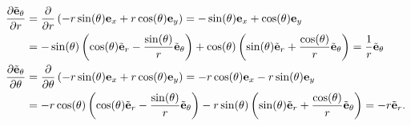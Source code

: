 \begin{example}
\begin{align*}
    \pdv{\tilde{\mathbf{e}}_\theta}{r} &= \pdv{}{r}\left(-r\sin(\theta) \mathbf{e}_x + r\cos(\theta)\mathbf{e}_y\right) = -\sin(\theta)\mathbf{e}_x + \cos(\theta)\mathbf{e}_y \\
                                &= -\sin(\theta)\left(\cos(\theta)\tilde{\mathbf{e}}_r - \frac{\sin(\theta)}{r}\tilde{\mathbf{e}}_\theta\right) + \cos(\theta)\left(\sin(\theta)\tilde{\mathbf{e}}_r + \frac{\cos(\theta)}{r}\tilde{\mathbf{e}}_\theta\right) = \frac{1}{r}\tilde{\mathbf{e}}_\theta \\
    \pdv{\tilde{\mathbf{e}}_\theta}{\theta} &= \pdv{}{\theta}\left(-r\sin(\theta) \mathbf{e}_x + r\cos(\theta)\mathbf{e}_y\right) = -r\cos(\theta)\mathbf{e}_x - r\sin(\theta)\mathbf{e}_y \\
                                    &= -r\cos(\theta)\left(\cos(\theta)\tilde{\mathbf{e}}_r - \frac{\sin(\theta)}{r}\tilde{\mathbf{e}}_\theta\right) - r\sin(\theta)\left(\sin(\theta)\tilde{\mathbf{e}}_r + \frac{\cos(\theta)}{r}\tilde{\mathbf{e}}_\theta\right) = -r\tilde{\mathbf{e}}_r
  .\end{align*}


\end{example}
